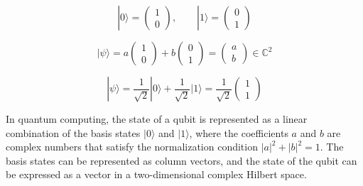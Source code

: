 \[
|0\rangle =
\begin{pmatrix}
1 \\
0
\end{pmatrix},
\qquad
|1\rangle =
\begin{pmatrix}
0 \\
1
\end{pmatrix}
\]

\[
|\psi\rangle =
a
\begin{pmatrix}
1 \\
0
\end{pmatrix}
+
b
\begin{pmatrix}
0 \\
1
\end{pmatrix}
=
\begin{pmatrix}
a \\
b
\end{pmatrix}
\in \mathbb{C}^2
\]

\[
|\psi\rangle =
\frac{1}{\sqrt{2}}|0\rangle +
\frac{1}{\sqrt{2}}|1\rangle
=
\frac{1}{\sqrt{2}}
\begin{pmatrix}
1 \\
1
\end{pmatrix}
\]

\noindent
In quantum computing, the state of a qubit is represented as a linear combination of the basis states $|0\rangle$ and $|1\rangle$, where the coefficients $a$ and $b$ are complex numbers that satisfy the normalization condition $|a|^2 + |b|^2 = 1$. The basis states can be represented as column vectors, and the state of the qubit can be expressed as a vector in a two-dimensional complex Hilbert space.


